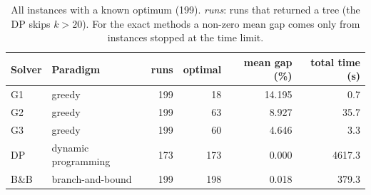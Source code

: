 \begin{table}[!htbp]\centering\small
\begin{tabular}{@{}llrrrr@{}}\toprule
Solver & Paradigm & runs & optimal & mean gap (\%) & total time (s)\\\midrule
G1 & greedy & 199 & 18 & 14.195 & 0.7\\
G2 & greedy & 199 & 63 & 8.927 & 35.7\\
G3 & greedy & 199 & 60 & 4.646 & 3.3\\
DP & dynamic programming & 173 & 173 & 0.000 & 4617.3\\
B\&B & branch-and-bound & 199 & 198 & 0.018 & 379.3\\
\bottomrule\end{tabular}
\caption{All instances with a known optimum (199). \emph{runs}: runs that returned a tree (the DP skips \(k>20\)). For the exact methods a non-zero mean gap comes only from instances stopped at the time limit.}\label{tab:overview}
\end{table}
